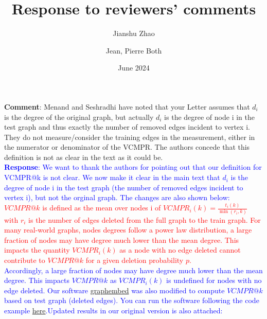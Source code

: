 \documentclass{article}
\title{Response to reviewers' comments}
\author[1]{Jianshu Zhao}
\author[2,*]{Jean, Pierre Both}
\affil[1]{Center for Bioinformatics and Computational Genomics, Georgia Institute of Technology, Atlanta, Georgia, USA}
\affil[2]{Université Paris-Saclay, CEA, List, Palaiseau, France. (Retired)}
\affil[*]{Corresponding author : jeanpierre.both@gmail.com}
\date{June 2024}
\begin{document}
\maketitle

\textbf{Comment}: Menand and Seshradhi have noted that your Letter assumes that $d_i$ 
is the degree of the original graph, but actually $d_i$ is the degree 
of node i in the test graph and thus exactly the number of removed 
edges incident to vertex i. They do not measure/consider the training 
edges in the measurement, either in the numerator or denominator of the VCMPR. 
The authors concede that this definition is not as clear in the text as it could be.\\

\textcolor{blue}{\textbf{Response}: We want to thank the authors for pointing out that our definition for VCMPR@k is not clear.
We now make it clear in the main text that $d_i$ is the degree 
of node i in the test graph (the number of removed 
edges incident to vertex i), but not the orginal graph. The changes are also shown below:}\\

\textcolor{red}{$VCMPR@k$ is defined as the mean over nodes i of  $ VCMPR_{i}(k)= \frac{t_{i}(k)}{\min(r_{i},k)}$ with $ r_{i} $ is the number of edges deleted from the full graph to the train graph. For many real-world graphs, nodes degrees follow a power law distribution, a large fraction of nodes may have degree much lower than the mean degree.
This impacts the quantity $ VCMPR_{i}(k)$ as a node with no edge deleted cannot contribute to $VCMPR@k$ for a given deletion probability $p$.} \\


\textcolor{blue}{Accordingly, a large fraction of nodes may have degree much lower than the mean degree.
This impacts $VCMPR@k$  as $VCMPR_{i}(k)$ is undefined for nodes with no edge deleted. Our software \href{https://github.com/jean-pierreBoth/graphembed}{\color{blue}graphembed} was also modified to compute $VCMPR@k$ based on test graph (deleted edges). 
You can run the software following the code example \href{https://github.com/jean-pierreBoth/linkauc/blob/master/running_graphembed.md}{\color{blue}here}.Updated results in our original version is also attached:} \\
\end{document}

